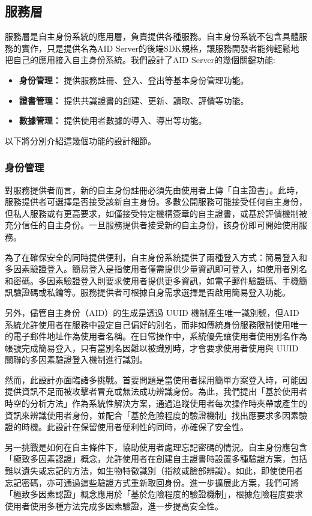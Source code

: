 \subsection{服務層}
服務層是自主身份系統的應用層，負責提供各種服務。自主身份系統不包含具體服務的實作，只是提供名為AID Server的後端SDK規格，讓服務開發者能夠輕鬆地把自己的應用接入自主身份系統。我們設計了AID Server的幾個關鍵功能:
\begin{itemize}
  \item \textbf{身份管理：} 提供服務註冊、登入、登出等基本身份管理功能。
  \item \textbf{證書管理：} 提供共識證書的創建、更新、讀取、評價等功能。
  \item \textbf{數據管理：} 提供使用者數據的導入、導出等功能。
\end{itemize}
以下將分別介紹這幾個功能的設計細節。
\subsubsection{身份管理}
對服務提供者而言，新的自主身份註冊必須先由使用者上傳「自主證書」。此時，服務提供者可選擇是否接受該新自主身份。多數公開服務可能接受任何自主身份，但私人服務或有更高要求，如僅接受特定機構簽章的自主證書，或基於評價機制被充分信任的自主身份。一旦服務提供者接受新的自主身份，該身份即可開始使用服務。

為了在確保安全的同時提供便利，自主身份系統提供了兩種登入方式：簡易登入和多因素驗證登入。簡易登入是指使用者僅需提供少量資訊即可登入，如使用者別名和密碼。多因素驗證登入則要求使用者提供更多資訊，如電子郵件驗證碼、手機簡訊驗證碼或私鑰等。服務提供者可根據自身需求選擇是否啟用簡易登入功能。

另外，儘管自主身份（AID）的生成是透過 UUID 機制\cite{uuid}產生唯一識別號，但AID系統允許使用者在服務中設定自己偏好的別名，而非如傳統身份服務限制使用唯一的電子郵件地址作為使用者名稱。在日常操作中，系統優先讓使用者使用別名作為帳號完成簡易登入，只有當別名因難以被識別時，才會要求使用者使用與 UUID 關聯的多因素驗證登入機制進行識別。

然而，此設計亦面臨諸多挑戰。首要問題是當使用者採用簡單方案登入時，可能因提供資訊不足而被攻擊者冒充或無法成功辨識身份。為此，我們提出「基於使用者時空的分析方法」作為系統性解決方案，通過追蹤使用者每次操作時夾帶或產生的資訊來辨識使用者身份，並配合「基於危險程度的驗證機制」找出應要求多因素驗證的時機。此設計在保留使用者便利性的同時，亦確保了安全性。

另一挑戰是如何在自主條件下，協助使用者處理忘記密碼的情況。自主身份應包含「極致多因素認證」概念，允許使用者在創建自主證書時設置多種驗證方案，包括難以遺失或忘記的方法，如生物特徵識別（指紋或臉部辨識）。如此，即使使用者忘記密碼，亦可通過這些驗證方式重新取回身份。進一步擴展此方案，我們可將「極致多因素認證」概念應用於「基於危險程度的驗證機制」，根據危險程度要求使用者使用多種方法完成多因素驗證，進一步提高安全性。

